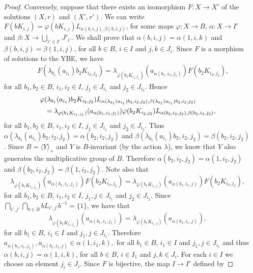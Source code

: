 \begin{proof}
	Conversely, suppose that there exists an isomorphism $F\colon
	X\rightarrow X'$ of the solutions $(X,r)$ and $(X',r')$. We can
	write $F(bK_{i,j})=\varphi(bK_{i,j})L_{\alpha(b,i,j),\beta(b,i,j)}$,
	for some maps $\varphi\colon X\rightarrow B$, $\alpha\colon
	X\rightarrow I'$ and $\beta \colon X\rightarrow \bigcup_{i'\in
		I'}J'_{i'}$. We shall prove that $\alpha(b,i,j)=\alpha(1,i,k)$ and
	$\beta(b,i,j)=\beta(1,i,j)$, for all $b\in B$, $i\in I$ and $j,k\in
	J_i$. Since $F$ is a morphism of solutions to the YBE, we have
	\begin{eqnarray}\label{F}
		&&F(\lambda_{b_1}(a_{i_1})b_2K_{i_2,j_2})
		=\lambda_{\varphi(b_1K_{i_1,j_1})}(a_{\alpha(b_1,i_1,j_1)})F(b_2K_{i_2,j_2}),\end{eqnarray}
	for all $b_1,b_2\in B$, $i_1,i_2\in I$,  $j_1\in J_{i_1}$ and
	$j_2\in J_{i_2}$. Hence
	\begin{eqnarray*}\lefteqn{\varphi(\lambda_{b_1}(a_{i_1})b_2K_{i_2,j_2})L_{\alpha(\lambda_{b_1}(a_{i_1})b_2,i_2,j_2),\beta(\lambda_{b_1}(a_{i_1})b_2,i_2,j_2)}}
		\\
		&&=\lambda_{\varphi(b_1K_{i_1,j_1})}(a_{\alpha(b_1,i_1,j_1)})\varphi(b_2K_{i_2,j_2})L_{\alpha(b_2,i_2,j_2),\beta(b_2,i_2,j_2)},\end{eqnarray*}
	for all $b_1,b_2\in B$, $i_1,i_2\in I$,  $j_1\in J_{i_1}$ and
	$j_2\in J_{i_2}$. Thus
	$\alpha(\lambda_{b_1}(a_{i_1})b_2,i_2,j_2)=\alpha(b_2,i_2,j_2)$ and
	$\beta(\lambda_{b_1}(a_{i_1})b_2,i_2,j_2)=\beta(b_2,i_2,j_2)$. Since
	$B=\langle Y\rangle_+$ and $Y$ is $B$-invariant (by the action
	$\lambda$), we know that $Y$ also generates the multiplicative group
	of $B$. Therefore $\alpha(b_2,i_2,j_2)=\alpha(1,i_2,j_2)$ and
	$\beta(b_2,i_2,j_2)=\beta(1,i_2,j_2)$. Note also that
	$$\lambda_{\varphi(b_1K_{i_1,j_1})}(a_{\alpha(b_1,i_1,j_1)})F(b_2K_{i_2,j_2})=\lambda_{\varphi(b_1K_{i_1,j})}(a_{\alpha(b_1,i_1,j)})F(b_2K_{i_2,j_2}),$$
	for all $b_1,b_2\in B$, $i_1,i_2\in I$,  $j_1,j\in J_{i_1}$ and
	$j_2\in J_{i_2}$. Since $\bigcap_{i',j'}\bigcap_{b\in
		B}bL_{i',j'}b^{-1}=\{ 1\}$, we have that
	$$\lambda_{\varphi(b_1K_{i_1,j_1})}(a_{\alpha(b_1,i_1,j_1)})=\lambda_{\varphi(b_1K_{i_1,j})}(a_{\alpha(b_1,i_1,j)}),$$
	for all $b_1\in B$, $i_1\in I$ and  $j_1,j\in J_{i_1}$. Therefore
	$a_{\alpha(b_1,i_1,j_1)},a_{\alpha(b_1,i_1,j)}\in \alpha(1,i_1,k),$
	for all $b_1\in B$, $i_1\in I$ and $j_1,j\in J_{i_1}$ and thus
	$\alpha(b,i,j)=\alpha(1,i,k)$, for all $b\in B$, $i\in I_1$ and
	$j,k\in J_{i}$. For each $i\in I$ we choose an element $j_i\in
	J_{i}$. Since $F$ is bijective, the map $I\rightarrow I'$ defined by

\end{proof}
